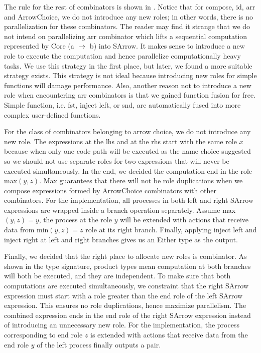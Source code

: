 The rule for the rest of combinators is shown in . Notice that for compose, id, arr and ArrowChoice, we do not introduce any new roles; in other words, there is no parallelization for these combinators. The reader may find it strange that we do not intend on parallelizing arr combinator which lifts a sequential computation represented by Core (a $\rightarrow$ b) into SArrow. It makes sense to introduce a new role to execute the computation and hence parallelize computationally heavy tasks. We use this strategy in the first place, but later, we found a more suitable strategy exists. This strategy is not ideal because introducing new roles for simple functions will damage performance. Also, another reason not to introduce a new role when encountering arr combinators is that we gained function fusion for free. Simple function, i.e. fst, inject left, or snd, are automatically fused into more complex user-defined functions.  %

For the class of combinators belonging to arrow choice, we do not introduce any new role. The expressions at the lhs and at the rhs start with the same role $x$ because when only one code path will be executed as the name choice suggested so we should not use separate roles for two expressions that will never be executed simultaneously. In the end, we decided the computation end in the role max$(y,z)$. Max guarantees that there will not be role duplications when we compose expressions formed by ArrowChoice combinators with other combinators. For the implementation, all processes in both left and right SArrow expressions are wrapped inside a branch operation separately. Assume max$(y, z) = y$, the process at the role $y$ will be extended with actions that receive data from min$(y, z) = z$ role at its right branch. Finally, applying inject left and inject right at left and right branches gives us an Either type as the output.

Finally, we decided that the right place to allocate new roles is \hask{&&&} combinator. As shown in the type signature, product types mean computation at both branches will both be executed, and they are independent. To make sure that both computations are executed simultaneously, we constraint that the right SArrow expression must start with a role greater than the end role of the left SArrow expression. This ensures no role duplications, hence maximize parallelism. The combined expression ends in the end role of the right SArrow expression instead of introducing an unnecessary new role. For the implementation, the process corresponding to end role $z$ is extended with actions that receive data from the end role $y$ of the left process finally outputs a pair.

